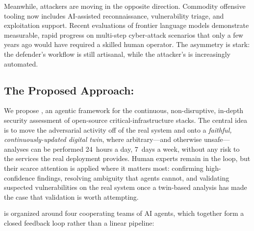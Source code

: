 Meanwhile, attackers are moving in the opposite direction. Commodity
offensive tooling now includes AI-assisted reconnaissance, vulnerability
triage, and exploitation support. Recent evaluations of frontier
language models demonstrate measurable, rapid progress on multi-step
cyber-attack scenarios that only a few years ago would have required
a skilled human operator. The asymmetry is stark: the defender's
workflow is still artisanal, while the attacker's is increasingly
automated.

\subsection{The Proposed Approach: \sysname}
\label{sec:intro-approach}

We propose \sysname, an agentic framework for the continuous,
non-disruptive, in-depth security assessment of open-source
critical-infrastructure stacks.
The central idea is to move the adversarial activity off of the real
system and onto a \emph{faithful, continuously-updated digital twin},
where arbitrary---and otherwise unsafe---analyses can be performed
24~hours a day, 7~days a week, without any risk to the services the
real deployment provides.
Human experts remain in the loop, but their scarce attention is applied
where it matters most: confirming high-confidence findings, resolving
ambiguity that agents cannot, and validating suspected vulnerabilities
on the real system once a twin-based analysis has made the case that
validation is worth attempting.

\sysname is organized around four cooperating teams of AI agents, which
together form a closed feedback loop rather than a linear pipeline:

